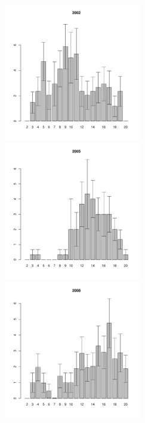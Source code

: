 	\begin{figure}[hp]

	\begin{minipage}[b]{.3\linewidth}
	\begin{center}
	\includegraphics[width=60mm]{../Barenc_Sea/Dalnezeleneckaya/DZ2_2002_.pdf}	
	\end{center}
	\end{minipage}
	\hfil %
	\begin{minipage}[b]{.3\linewidth}
	\begin{center}
	\includegraphics[width=60mm]{../Barenc_Sea/Dalnezeleneckaya/DZ2_2005_.pdf}
	\end{center}
	\end{minipage}
	\hfill
	\begin{minipage}[b]{.3\linewidth}
	\begin{center}
	\includegraphics[width=60mm]{../Barenc_Sea/Dalnezeleneckaya/DZ2_2008_.pdf}

\end{center}
\end{minipage}
\end{figure}
